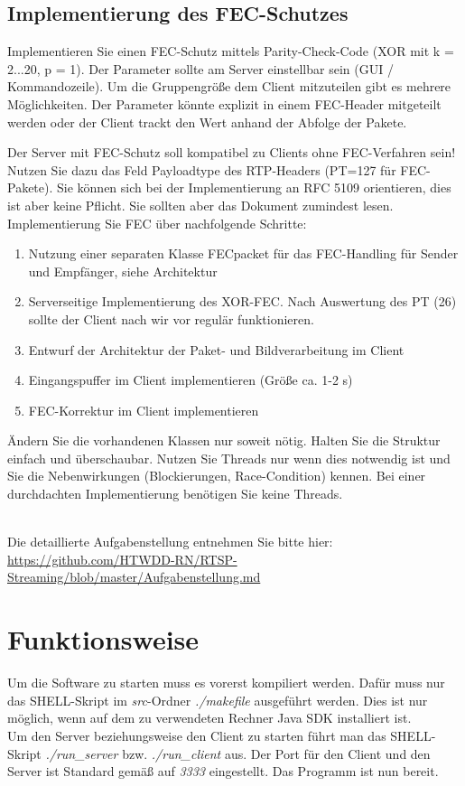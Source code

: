 \documentclass{scrartcl}
\newcommand{\ret}{$  $\\}
\begin{document}
\subsection{Implementierung des FEC-Schutzes}
Implementieren Sie einen FEC-Schutz mittels Parity-Check-Code (XOR mit k = 2...20, p = 1). Der Parameter sollte am Server einstellbar sein (GUI / Kommandozeile). Um die Gruppengröße dem Client mitzuteilen gibt es mehrere Möglichkeiten. Der Parameter könnte explizit in einem FEC-Header mitgeteilt werden oder der Client trackt den Wert anhand der Abfolge der Pakete.

Der Server mit FEC-Schutz soll kompatibel zu Clients ohne FEC-Verfahren sein! Nutzen Sie dazu das Feld Payloadtype des RTP-Headers (PT=127 für FEC-Pakete). Sie können sich bei der Implementierung an RFC 5109 orientieren, dies ist aber keine Pflicht. Sie sollten aber das Dokument zumindest lesen.
\newpage
Implementierung Sie FEC über nachfolgende Schritte:
\begin{enumerate}
	\item Nutzung einer separaten Klasse FECpacket für das FEC-Handling für Sender und Empfänger, siehe Architektur	
	\item Serverseitige Implementierung des XOR-FEC. Nach Auswertung des PT (26) sollte der Client nach wir vor regulär funktionieren.
	\item Entwurf der Architektur der Paket- und Bildverarbeitung im Client
	\item Eingangspuffer im Client implementieren (Größe ca. 1-2 s)
	\item FEC-Korrektur im Client implementieren
\end{enumerate}

Ändern Sie die vorhandenen Klassen nur soweit nötig. Halten Sie die Struktur einfach und überschaubar. Nutzen Sie Threads nur wenn dies notwendig ist und Sie die Nebenwirkungen (Blockierungen, Race-Condition) kennen. Bei einer durchdachten Implementierung benötigen Sie keine Threads.

\ret
Die detaillierte Aufgabenstellung entnehmen Sie bitte hier:\ret \url{https://github.com/HTWDD-RN/RTSP-Streaming/blob/master/Aufgabenstellung.md}
\newpage
\section{Funktionsweise}
Um die Software zu starten muss es vorerst kompiliert werden. Dafür muss nur das SHELL-Skript im \emph{src}-Ordner \emph{./makefile} ausgeführt werden. Dies ist nur möglich, wenn auf dem zu verwendeten Rechner Java SDK installiert ist.\ret
Um den Server beziehungsweise den Client zu starten führt man das SHELL-Skript \emph{./run\_server} bzw. \emph{./run\_client} aus. Der Port für den Client und den Server ist Standard gemäß auf \emph{3333} eingestellt. Das Programm ist nun bereit.
\end{document}
